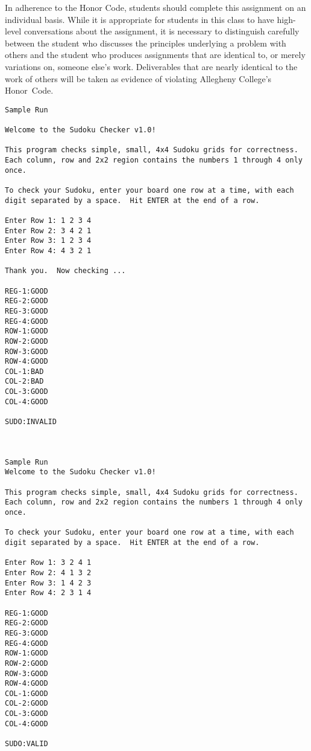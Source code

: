 In adherence to the Honor Code, students should complete this assignment on an individual basis. While it is appropriate
for students in this class to have high-level conversations about the assignment, it is necessary to distinguish
carefully between the student who discusses the principles underlying a problem with others and the student who produces
assignments that are identical to, or merely variations on, someone else's work.  Deliverables that are nearly identical
to the work of others will be taken as evidence of violating Allegheny College's \mbox{Honor Code}.  



\begin{verbatim}
Sample Run

Welcome to the Sudoku Checker v1.0!

This program checks simple, small, 4x4 Sudoku grids for correctness. Each column, row and 2x2 region contains the numbers 1 through 4 only once.

To check your Sudoku, enter your board one row at a time, with each digit separated by a space.  Hit ENTER at the end of a row.

Enter Row 1: 1 2 3 4
Enter Row 2: 3 4 2 1
Enter Row 3: 1 2 3 4
Enter Row 4: 4 3 2 1

Thank you.  Now checking ...

REG-1:GOOD
REG-2:GOOD
REG-3:GOOD
REG-4:GOOD
ROW-1:GOOD
ROW-2:GOOD
ROW-3:GOOD
ROW-4:GOOD
COL-1:BAD
COL-2:BAD
COL-3:GOOD
COL-4:GOOD

SUDO:INVALID



Sample Run
Welcome to the Sudoku Checker v1.0!

This program checks simple, small, 4x4 Sudoku grids for correctness. Each column, row and 2x2 region contains the numbers 1 through 4 only once.

To check your Sudoku, enter your board one row at a time, with each digit separated by a space.  Hit ENTER at the end of a row.

Enter Row 1: 3 2 4 1
Enter Row 2: 4 1 3 2
Enter Row 3: 1 4 2 3
Enter Row 4: 2 3 1 4

REG-1:GOOD
REG-2:GOOD
REG-3:GOOD
REG-4:GOOD
ROW-1:GOOD
ROW-2:GOOD
ROW-3:GOOD
ROW-4:GOOD
COL-1:GOOD
COL-2:GOOD
COL-3:GOOD
COL-4:GOOD

SUDO:VALID

\end{verbatim}




